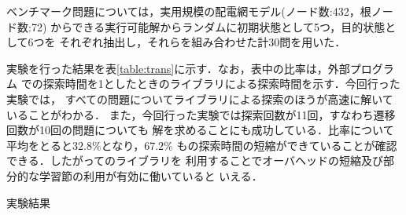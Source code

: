 ベンチマーク問題については，実用規模の配電網モデル(ノード数:432，根ノード数:72)
からできる実行可能解からランダムに初期状態として5つ，目的状態として6つを
それぞれ抽出し，それらを組み合わせた計30問を用いた．

実験を行った結果を表\ref{table:trans}に示す．なお，表中の比率は，外部プログラム
での探索時間を1としたときのライブラリによる探索時間を示す．今回行った実験では，
すべての問題についてライブラリによる探索のほうが高速に解いていることがわかる．
また，今回行った実験では探索回数が11回，すなわち遷移回数が10回の問題についても
解を求めることにも成功している．比率について平均をとると$32.8\%$となり，$67.2\%$
もの探索時間の短縮ができていることが確認できる．したがって\clingo のライブラリを
利用することでオーバヘッドの短縮及び部分的な学習節の利用が有効に働いていると
いえる．

\begin{table}[htbp]
 \centering
 \caption{実験結果}
 \label{table:trans}
 
\end{table}


